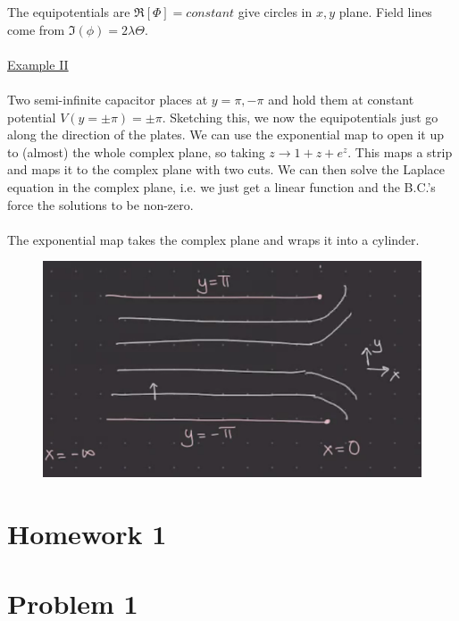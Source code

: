 \documentclass[a4paper,12pt]{article}
\begin{document}
The equipotentials are $\Re[\Phi]=constant$ give circles in $x,y$ plane. Field lines come from $\Im(\phi)=2\lambda \Theta$.
\\\\
\underline{Example II}
\\\\
Two semi-infinite capacitor places at $y={\pi,-\pi}$ and hold them at constant potential $V(y=\pm \pi)=\pm \pi$. Sketching this, we now the equipotentials just go along the direction of the plates. We can use the exponential map to open it up to (almost) the whole complex plane, so taking $z\to1+z+e^z$. This maps a strip and maps it to the complex plane with two cuts. We can then solve the Laplace equation in the complex plane, i.e. we just get a linear function and the B.C.'s force the solutions to be non-zero.\\\\
The exponential map takes the complex plane and wraps it into a cylinder.
\begin{figure}[H]
	\centering
	\includegraphics[width=0.7\linewidth]{5}
	\caption{}
	\label{fig:4}
\end{figure}
\newpage
\section*{Homework 1}
\section*{Problem 1}
\end{document}

